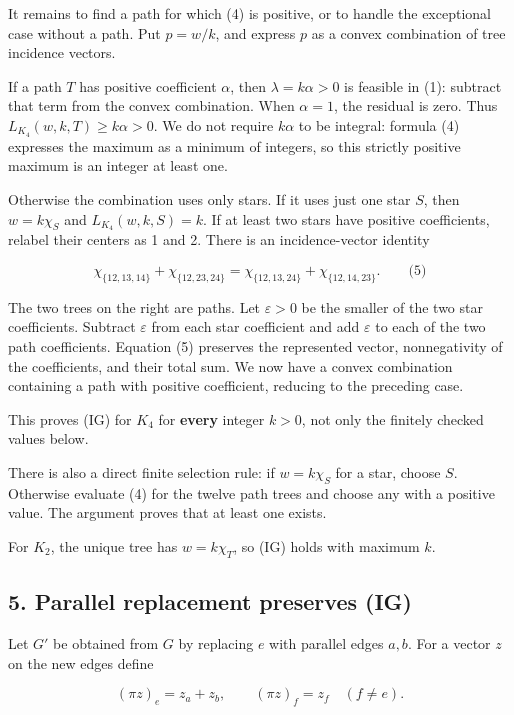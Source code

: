 \documentclass{article}
\begin{document}
It remains to find a path for which (4) is positive, or to handle the exceptional case without a path. Put \(p=w/k\), and express \(p\) as a convex combination of tree incidence vectors.

If a path \(T\) has positive coefficient \(\alpha\), then \(\lambda=k\alpha\gt 0\) is feasible in (1): subtract that term from the convex combination. When \(\alpha=1\), the residual is zero. Thus \(L_{K_4}(w,k,T)\ge k\alpha\gt 0\). We do not require \(k\alpha\) to be integral: formula (4) expresses the maximum as a minimum of integers, so this strictly positive maximum is an integer at least one.

Otherwise the combination uses only stars. If it uses just one star \(S\), then \(w=k\chi_S\) and \(L_{K_4}(w,k,S)=k\). If at least two stars have positive coefficients, relabel their centers as 1 and 2. There is an incidence-vector identity

\[
\chi_{\{12,13,14\}}+\chi_{\{12,23,24\}}
=\chi_{\{12,13,24\}}+\chi_{\{12,14,23\}}.\qquad\text{(5)}
\]

The two trees on the right are paths. Let \(\varepsilon\gt 0\) be the smaller of the two star coefficients. Subtract \(\varepsilon\) from each star coefficient and add \(\varepsilon\) to each of the two path coefficients. Equation (5) preserves the represented vector, nonnegativity of the coefficients, and their total sum. We now have a convex combination containing a path with positive coefficient, reducing to the preceding case.

This proves (IG) for \(K_4\) for \textbf{every} integer \(k\gt 0\), not only the finitely checked values below.

There is also a direct finite selection rule: if \(w=k\chi_S\) for a star, choose \(S\). Otherwise evaluate (4) for the twelve path trees and choose any with a positive value. The argument proves that at least one exists.

For \(K_2\), the unique tree has \(w=k\chi_T\), so (IG) holds with maximum \(k\).

\subsection{5. Parallel replacement preserves (IG)}

Let \(G'\) be obtained from \(G\) by replacing \(e\) with parallel edges \(a,b\). For a vector \(z\) on the new edges define

\[
(\pi z)_e=z_a+z_b,\qquad (\pi z)_f=z_f\quad(f\ne e).
\]
\end{document}

